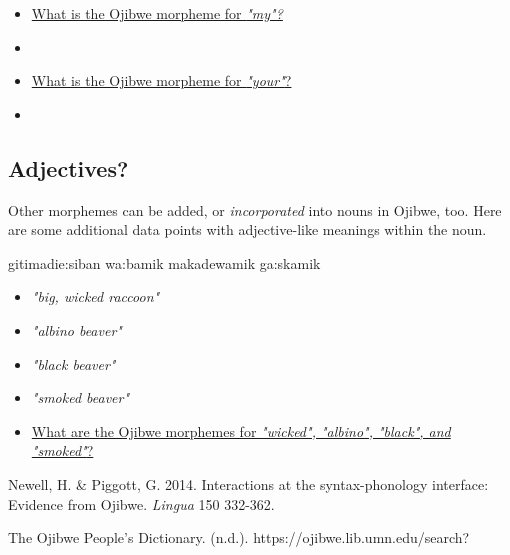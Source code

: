 \documentclass[a4paper,11pt]{article}
\begin{document}
\vspace{1cm}
\begin{itemize}
\item \underline{What is the Ojibwe morpheme for \textit{"my"?}}
\item[] 
\item \underline{What is the Ojibwe morpheme for \textit{"your"}?}
\item[] 
\end{itemize}



\pagebreak
\subsection{Adjectives?}

Other morphemes can be added, or \textit{incorporated} into nouns in Ojibwe, too. Here are some additional data points with adjective-like meanings within the noun.

\vspace{1cm}
\begin{multicols}{2}
\begin{exe}
\ex gitimad{\textyogh}ie:siban 
\ex wa:bamik
\ex makadewamik 
\ex ga:skamik
\end{exe}
\columnbreak
\begin{itemize}
\item[] \textit{"big, wicked raccoon"}
\item[] \textit{"albino beaver"}
\item[] \textit{"black beaver"}
\item[] \textit{"smoked beaver"}
\end{itemize}
\end{multicols}
\vspace{1cm}

\begin{itemize}
\item \underline{What are the Ojibwe morphemes for \textit{"wicked", "albino", "black", and "smoked"}?}
\end{itemize}
\vspace{4cm}

\begin{thebibliography}{20}
\addtolength{\leftmargin}{0.2in} %
\setlength{\itemindent}{-0.2in}

 Newell, H. \& Piggott, G. 2014. Interactions at the syntax-phonology interface: Evidence from Ojibwe. \textit{Lingua} 150 332-362.

 The Ojibwe People’s Dictionary. (n.d.). https://ojibwe.lib.umn.edu/search?


\end{thebibliography}
\end{document}
